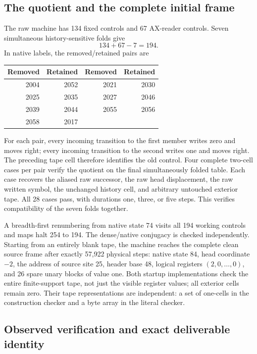 \subsection{The quotient and the complete initial frame}

The raw machine has 134 fixed controls and 67 AX-reader controls.
Seven simultaneous history-sensitive folds give
\[
                         134+67-7=194.
\]
In native labels, the removed/retained pairs are
\begin{center}
\begin{tabular}{rr@{\qquad}rr}
\toprule
Removed&Retained&Removed&Retained\\
\midrule
2004&2052&2021&2030\\
2025&2035&2027&2046\\
2039&2044&2055&2056\\
2058&2017&&\\
\bottomrule
\end{tabular}
\end{center}
For each pair, every incoming transition to the first member writes
zero and moves right; every incoming transition to the second writes
one and moves right. The preceding tape cell therefore identifies the
old control. Four complete two-cell cases per pair verify the quotient
on the final simultaneously folded table. Each case recovers the
aliased raw successor, the raw head displacement, the raw written
symbol, the unchanged history cell, and arbitrary untouched exterior
tape. All 28 cases pass, with durations one, three, or five steps.
This verifies compatibility of the seven folds together.

A breadth-first renumbering from native state 74 visits all 194 working
controls and maps halt 254 to 194. The dense/native conjugacy is checked
independently. Starting from an entirely blank tape, the machine reaches
the complete clean source frame after exactly 57,922 physical steps:
native state 84, head coordinate $-2$, the address of source site 25,
header base 48, logical registers $(2,0,\ldots,0)$, and 26 spare unary
blocks of value one. Both startup implementations check the entire
finite-support tape, not just the visible register values; all exterior
cells remain zero. Their tape representations are independent: a set
of one-cells in the construction checker and a byte array in the literal
checker.

\subsection{Observed verification and exact deliverable identity}

